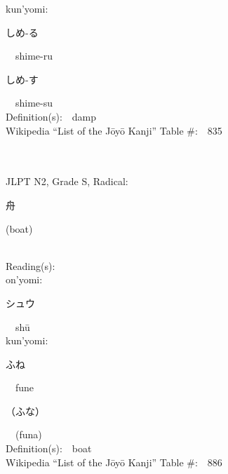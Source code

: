 \begin{multicols}{2}
{\hspace*{1em}}kun'yomi:\ \ \\
{\hspace*{2em}}{\begin{CJK}{UTF8}{min} しめ-る \end{CJK}}\ \ shime-ru\ \ \\
{\hspace*{2em}}{\begin{CJK}{UTF8}{min} しめ-す \end{CJK}}\ \ shime-su\ \ \\
Definition(s):\ \ damp \\
Wikipedia ``List of the J\=oy\=o Kanji'' Table \#:\ \ 835 \\
\ \ \\
{\fontsize{34pt}{40pt}  }\ \ \\  %
{JLPT N2, Grade S, Radical:\ \ {\begin{CJK}{UTF8}{min} 舟 \end{CJK}} (boat) } \\
Reading(s):\ \ \\
{\hspace*{1em}}on'yomi:\ \ \\
{\hspace*{2em}}{\begin{CJK}{UTF8}{min} シュウ \end{CJK}}\ \ sh\=u\ \ \\
{\hspace*{1em}}kun'yomi:\ \ \\
{\hspace*{2em}}{\begin{CJK}{UTF8}{min} ふね \end{CJK}}\ \ fune\ \ \\
{\hspace*{2em}}{\begin{CJK}{UTF8}{min} （ふな） \end{CJK}}\ \ (funa)\ \ \\
Definition(s):\ \ boat \\
Wikipedia ``List of the J\=oy\=o Kanji'' Table \#:\ \ 886 \\
\ \ \\
{\fontsize{34pt}{40pt}  }\ \ \\  %

\end{multicols}
